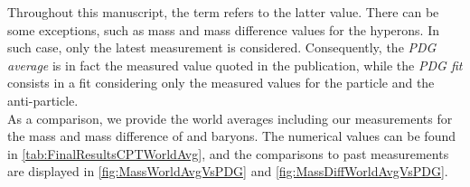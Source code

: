 Throughout this manuscript, the term  refers to the latter value. There can be some exceptions, such as mass and mass difference values for the \rmXiPM hyperons. In such case, only the latest measurement is considered. Consequently, the \textit{PDG average} is in fact the measured value quoted in the publication, while the \textit{PDG fit} consists in a fit considering only the measured values for the particle and the anti-particle.\\

As a comparison, we provide the world averages including our measurements for the mass and mass difference of \rmXiPM and \rmOmegaPM baryons. The numerical values can be found in \tab\ref{tab:FinalResultsCPTWorldAvg}, and the comparisons to past measurements are displayed in \figs\ref{fig:MassWorldAvgVsPDG} and \ref{fig:MassDiffWorldAvgVsPDG}.

